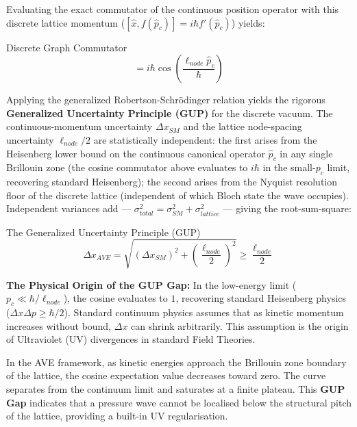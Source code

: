 Evaluating the exact commutator of the continuous position operator with this discrete lattice momentum ($[\hat{x}, f(\hat{p}_c)] = i\hbar f'(\hat{p}_c)$) yields:
\begin{resultbox}{Discrete Graph Commutator}
\begin{equation}
    [\hat{x}, \langle \hat{P} \rangle] = i\hbar \cos\left(\frac{\ell_{node} \hat{p}_c}{\hbar}\right)
\end{equation}
\end{resultbox}

Applying the generalized Robertson-Schr\"odinger relation yields the rigorous \textbf{Generalized Uncertainty Principle (GUP)} for the discrete vacuum. The continuous-momentum uncertainty $\Delta x_{SM}$ and the lattice node-spacing uncertainty $\ell_{node}/2$ are statistically independent: the first arises from the Heisenberg lower bound on the continuous canonical operator $\hat{p}_c$ in any single Brillouin zone (the cosine commutator above evaluates to $i\hbar$ in the small-$p_c$ limit, recovering standard Heisenberg); the second arises from the Nyquist resolution floor of the discrete lattice (independent of which Bloch state the wave occupies). Independent variances add --- $\sigma^2_{total} = \sigma^2_{SM} + \sigma^2_{lattice}$ --- giving the root-sum-square:
\begin{resultbox}{The Generalized Uncertainty Principle (GUP)}
\begin{equation}
    \Delta x_{AVE} = \sqrt{(\Delta x_{SM})^2 + \left(\frac{\ell_{node}}{2}\right)^2} \ge \frac{\ell_{node}}{2}
\end{equation}
\end{resultbox}

\textbf{The Physical Origin of the GUP Gap:} In the low-energy limit ($p_c \ll \hbar/\ell_{node}$), the cosine evaluates to $1$, recovering standard Heisenberg physics ($\Delta x \Delta p \ge \hbar/2$). Standard continuum physics assumes that as kinetic momentum increases without bound, $\Delta x$ can shrink arbitrarily. This assumption is the origin of Ultraviolet (UV) divergences in standard Field Theories.

In the AVE framework, as kinetic energies approach the Brillouin zone boundary of the lattice, the cosine expectation value decreases toward zero. The curve separates from the continuum limit and saturates at a finite plateau. This \textbf{GUP Gap} indicates that a pressure wave cannot be localised below the structural pitch of the lattice, providing a built-in UV regularisation.

